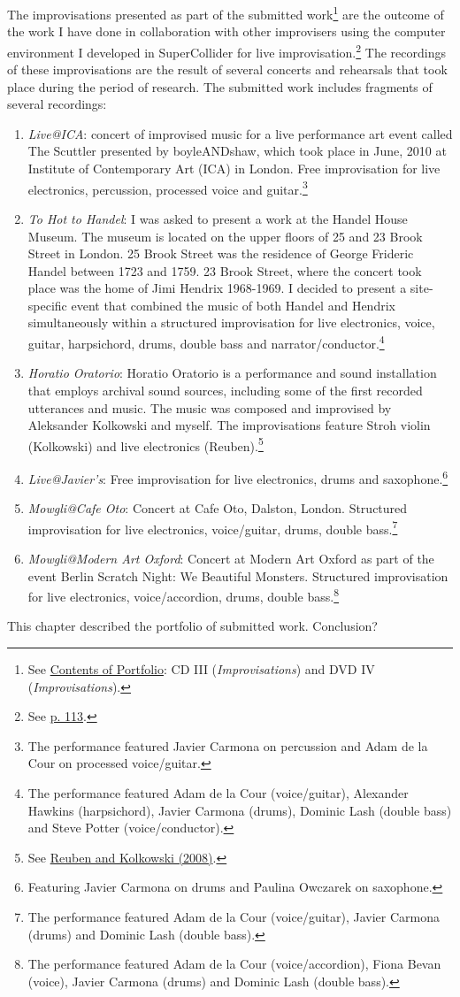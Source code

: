The improvisations presented as part of the submitted work\footnote{See \hyperlink{portfolio}{Contents of Portfolio}: CD III (\emph{Improvisations}) and DVD IV (\emph{Improvisations}).} are the outcome of the work I have done in collaboration with other improvisers using the computer environment I developed in SuperCollider for live improvisation.\footnote{See \hyperlink{improvprog}{p. 113}.} The recordings of these improvisations are the result of several concerts and rehearsals that took place during the period of research. The submitted work includes fragments of several recordings:
\begin{enumerate} 
\item \emph{Live@ICA}: concert of improvised music for a live performance art event called The Scuttler presented by boyleANDshaw, which took place in June, 2010 at Institute of Contemporary Art (ICA) in London. Free improvisation for live electronics, percussion, processed voice and guitar.\footnote{The performance featured Javier Carmona on percussion and Adam de la Cour on processed voice/guitar.}
\item \emph{To Hot to Handel}: I was asked to present a work at the Handel House Museum. The museum is located on the upper floors of 25 and 23 Brook Street in London. 25 Brook Street was the residence of George Frideric Handel between 1723 and 1759. 23 Brook Street, where the concert took place was the home of Jimi Hendrix 1968-1969. I decided to present a site-specific event that combined the music of both Handel and Hendrix simultaneously within a structured improvisation for live electronics, voice, guitar, harpsichord, drums, double bass and narrator/conductor.\footnote{The performance featured Adam de la Cour (voice/guitar), Alexander Hawkins (harpsichord), Javier Carmona (drums), Dominic Lash (double bass) and Steve Potter (voice/conductor).}
\item \emph{Horatio Oratorio}: Horatio Oratorio is a performance and sound installation that employs archival sound sources, including some of the first recorded utterances and music. The music was composed and improvised by Aleksander Kolkowski and myself. The improvisations feature Stroh violin (Kolkowski) and live electronics (Reuben).\footnote{See \hyperlink{reuben}{Reuben and Kolkowski (2008)}.}
\item \emph{Live@Javier's}: Free improvisation for live electronics, drums and saxophone.\footnote{Featuring Javier Carmona on drums and Paulina Owczarek on saxophone.}
\item \emph{Mowgli@Cafe Oto}: Concert at Cafe Oto, Dalston, London. Structured improvisation for live electronics, voice/guitar, drums, double bass.\footnote{The performance featured Adam de la Cour (voice/guitar), Javier Carmona (drums) and Dominic Lash (double bass).}
\item \emph{Mowgli@Modern Art Oxford}: Concert at Modern Art Oxford as part of the event Berlin Scratch Night: We Beautiful Monsters. Structured improvisation for live electronics, voice/accordion, drums, double bass.\footnote{The performance featured Adam de la Cour (voice/accordion), Fiona Bevan (voice), Javier Carmona (drums) and Dominic Lash (double bass).}
\end{enumerate}

\indent

This chapter described the portfolio of submitted work. Conclusion?

\label{ch:compositions}